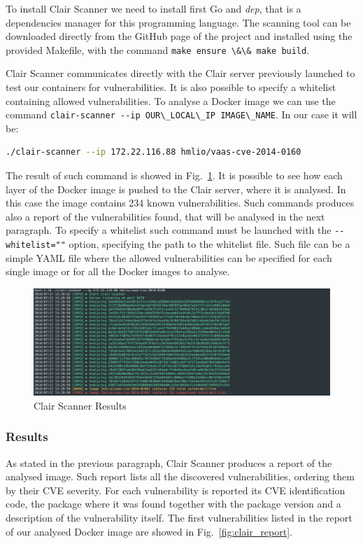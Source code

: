 \documentclass[a4paper,12pt]{article}
\newcommand{\code}[1]{\lstinline|#1|}
\def\myfig#1{Fig.~#1\xspace}
\begin{document}
To install Clair Scanner we need to install first Go and \textit{dep}, that is a
dependencies manager for this programming language. The scanning tool can be
downloaded directly from the GitHub page of the project and installed using the
provided Makefile, with the command \code{make ensure \&\& make build}.
\par Clair Scanner communicates directly with the Clair server previously
launched to test our containers for vulnerabilities. It is also possible to
specify a whitelist containing allowed vulnerabilities. To analyse a Docker
image we can use the command \code{clair-scanner --ip OUR\_LOCAL\_IP
IMAGE\_NAME}. In our case it will be:
\begin{lstlisting}[language=bash,breaklines]
  ./clair-scanner --ip 172.22.116.88 hmlio/vaas-cve-2014-0160
\end{lstlisting}
The result of such command is showed in \myfig{\ref{fig:clair_scanner_cmd}}. It
is possible to see how each layer of the Docker image is pushed to the Clair
server, where it is analysed. In this case the image contains 234 known
vulnerabilities. Such commands produces also a report of the vulnerabilities
found,  that will be analysed in the next paragraph. To specify a whitelist such
command must be launched with the \code{--whitelist=""} option, specifying the
path to the whitelist file. Such file can be a simple YAML file where the
allowed vulnerabilities can be specified for each single image or for all the
Docker images to analyse.   

\begin{figure}[ht!]
  \centerline{\includegraphics[width=1\textwidth]{clair_scanner_cmd.png}}
  \caption{Clair Scanner Results}
  \label{fig:clair_scanner_cmd}
  \end{figure}

\subsubsection{Results}

As stated in the previous paragraph, Clair Scanner produces a report of the
analysed image. Such report lists all the discovered vulnerabilities, ordering
them by their CVE severity. For each vulnerability is reported its CVE
identification code, the package where it was found together with the package
version and a description of the vulnerability itself. The first vulnerabilities
listed in the report of our analysed Docker image are showed in
\myfig{\ref{fig:clair_report}}.
\end{document}
